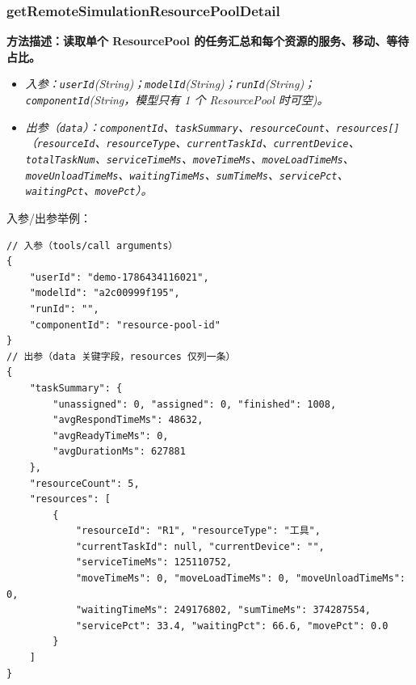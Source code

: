 \subsubsection{getRemoteSimulationResourcePoolDetail}
\bf{方法描述}：读取单个 ResourcePool 的任务汇总和每个资源的服务、移动、等待占比。
\begin{itemize}
	\item \it{入参}：\texttt{userId}(String)；\texttt{modelId}(String)；\texttt{runId}(String)；\texttt{componentId}(String，模型只有 1 个 ResourcePool 时可空)。
	\item \it{出参}（\texttt{data}）：\texttt{componentId}、\texttt{taskSummary}、\texttt{resourceCount}、\texttt{resources[]}（\texttt{resourceId}、\texttt{resourceType}、\texttt{currentTaskId}、\texttt{currentDevice}、\texttt{totalTaskNum}、\texttt{serviceTimeMs}、\texttt{moveTimeMs}、\texttt{moveLoadTimeMs}、\texttt{moveUnloadTimeMs}、\texttt{waitingTimeMs}、\texttt{sumTimeMs}、\texttt{servicePct}、\texttt{waitingPct}、\texttt{movePct}）。
\end{itemize}
入参/出参举例：
\begin{lstlisting}
// 入参（tools/call arguments）
{
    "userId": "demo-1786434116021",
    "modelId": "a2c00999f195",
    "runId": "",
    "componentId": "resource-pool-id"
}
// 出参（data 关键字段，resources 仅列一条）
{
    "taskSummary": {
        "unassigned": 0, "assigned": 0, "finished": 1008,
        "avgRespondTimeMs": 48632,
        "avgReadyTimeMs": 0,
        "avgDurationMs": 627881
    },
    "resourceCount": 5,
    "resources": [
        {
            "resourceId": "R1", "resourceType": "工具",
            "currentTaskId": null, "currentDevice": "",
            "serviceTimeMs": 125110752,
            "moveTimeMs": 0, "moveLoadTimeMs": 0, "moveUnloadTimeMs": 0,
            "waitingTimeMs": 249176802, "sumTimeMs": 374287554,
            "servicePct": 33.4, "waitingPct": 66.6, "movePct": 0.0
        }
    ]
}
\end{lstlisting}\vspace{-30pt}

